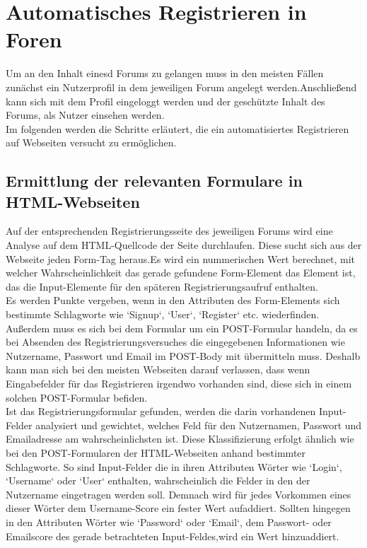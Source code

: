 \section {Automatisches Registrieren in Foren}
Um an den Inhalt einesd Forums zu gelangen muss in den meisten Fällen zunächst ein Nutzerprofil in dem jeweiligen Forum angelegt werden.Anschließend kann sich mit dem Profil eingeloggt werden und der geschützte Inhalt des Forums, als Nutzer einsehen werden. \\
Im folgenden werden die Schritte erläutert, die ein automatisiertes Registrieren auf Webseiten versucht zu ermöglichen.
\subsection{Ermittlung der relevanten Formulare in HTML-Webseiten}
Auf der entsprechenden Registrierungsseite des jeweiligen Forums wird eine Analyse auf dem HTML-Quellcode der Seite durchlaufen.
Diese sucht sich aus der Webseite jeden Form-Tag heraus.Es wird ein nummerischen Wert berechnet, mit welcher Wahrscheinlichkeit das gerade gefundene Form-Element das Element ist, das die Input-Elemente für den späteren Registrierungsaufruf enthalten. \\
Es werden Punkte vergeben, wenn in den Attributen des Form-Elements sich bestimmte Schlagworte wie `Signup`, `User`, `Register` etc. wiederfinden. Außerdem muss es sich bei dem Formular um ein POST-Formular handeln, da es bei Absenden des Registrierungsversuches die eingegebenen Informationen wie Nutzername, Passwort und Email im POST-Body mit übermitteln muss.
Deshalb kann man sich bei den meisten Webseiten darauf verlassen, dass wenn Eingabefelder für das Registrieren irgendwo vorhanden sind, diese sich in einem solchen POST-Formular befiden.\\
Ist das Registrierungsformular gefunden, werden die darin vorhandenen Input-Felder analysiert und gewichtet, welches Feld für den Nutzernamen, Passwort und Emailadresse am wahrscheinlichsten ist.
Diese Klassifizierung erfolgt ähnlich wie bei den POST-Formularen der HTML-Webseiten anhand bestimmter Schlagworte.
So sind Input-Felder die in ihren Attributen Wörter wie `Login`, `Username` oder `User` enthalten, wahrscheinlich die Felder in den der Nutzername eingetragen werden soll. Demnach wird für jedes Vorkommen eines dieser Wörter dem Username-Score ein fester Wert aufaddiert. Sollten hingegen in den Attributen Wörter wie `Password` oder `Email`, dem Passwort- oder Emailscore des gerade betrachteten Input-Feldes,wird ein Wert hinzuaddiert.
